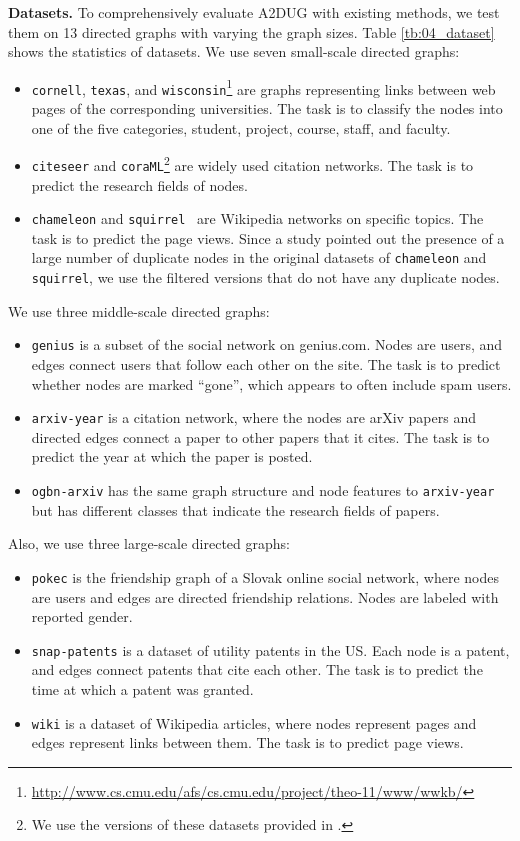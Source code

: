 \smallskip \noindent \textbf{Datasets.}
To comprehensively evaluate A2DUG with existing methods, we test them on 13 directed graphs with varying the graph sizes.
Table \ref{tb:04_dataset} shows the statistics of datasets.
We use seven small-scale directed graphs:
\begin{itemize}
    \item \texttt{cornell}, \texttt{texas}, and \texttt{wisconsin}\footnote{\url{http://www.cs.cmu.edu/afs/cs.cmu.edu/project/theo-11/www/wwkb/}} are graphs representing links between
web pages of the corresponding universities. The task is to classify the nodes into one of the five categories, student, project, course, staff, and faculty.
    \item \texttt{citeseer} and \texttt{coraML}\footnote{We use the versions
of these datasets provided in \cite{zhang2021magnet}.} are widely used citation networks. The task is to predict the research fields of nodes. 
    \item \texttt{chameleon} and \texttt{squirrel}~\cite{platonov2023a} are Wikipedia networks on specific topics. The task is to predict the page views. Since a study \cite{platonov2023a} pointed out the presence of a large number of duplicate nodes in the original datasets of \texttt{chameleon} and \texttt{squirrel}, we use the filtered versions that do not have any duplicate nodes.
\end{itemize}
We use three middle-scale directed graphs:
\begin{itemize}
    \item \texttt{genius} \cite{lim2021large} is a subset of the social network on genius.com. Nodes are users, and edges connect users that follow each other on the site. The task is to predict whether nodes are marked ``gone'', which appears to often include spam users.
    \item \texttt{arxiv-year} \cite{lim2021large} is a citation network, where the nodes are arXiv papers and directed edges connect a paper to other papers that it cites. The task is to predict the year at which the paper is posted.
    \item \texttt{ogbn-arxiv} \cite{hu2020ogb} has the same graph structure and node features to \texttt{arxiv-year} but has different classes that indicate the research fields of papers. 
\end{itemize}
Also, we use three large-scale directed graphs: 
\begin{itemize}
    \item \texttt{pokec} \cite{lim2021large} is the friendship graph of a Slovak online social network, where nodes are users and edges are directed friendship relations. Nodes are labeled with reported gender.
    \item \texttt{snap-patents} \cite{lim2021large} is a dataset of utility patents in the US. Each node is a patent, and edges connect patents that cite each other. The task is to predict the time at which a patent was granted. 
    \item \texttt{wiki} \cite{lim2021large} is a dataset of Wikipedia articles, where nodes represent pages and edges represent links between them. The task is to predict page views. 
\end{itemize}


